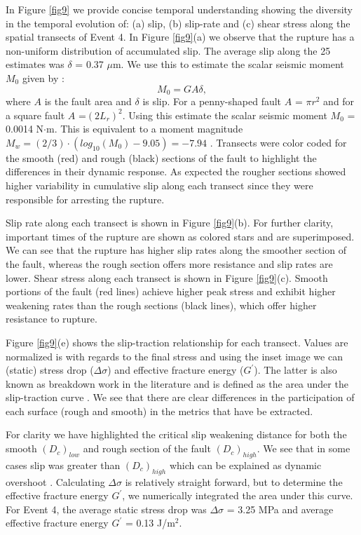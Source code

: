 \documentclass[preprint,1p, 10pt,authoryear]{elsarticle}
\begin{document}
In Figure \ref{fig9} we provide concise temporal understanding showing the diversity in the temporal evolution of: (a) slip, (b) slip-rate and (c) shear stress along the spatial transects of Event 4. In Figure \ref{fig9}(a) we observe that the rupture has a non-uniform distribution of accumulated slip. The average slip along the 25 estimates was $\delta$ = 0.37 $\mu$m.  We use this to estimate the scalar seismic moment $M_{0}$ given by \citet{Aki1966}: 
\begin{equation}
M_{0} = G A \delta, 
\label{eq9}
\end{equation}
\noindent where $A$ is the fault area and $\delta$ is slip. For a penny-shaped fault $A$ = $\pi r^{2}$ and for a square fault $A$ =$(2L_{r})^{2}$. Using this estimate the scalar seismic moment $M_{0}$ = 0.0014 N$\cdot$m. This is equivalent to a moment magnitude $M_{w} = (2/3)\cdot(log_{10}(M_{0})-9.05) = -7.94$ \citep{Kanamori1975}.  Transects were color coded for the smooth (red) and rough (black) sections of the fault to highlight the differences in their dynamic response. As expected the rougher sections showed higher variability in cumulative slip along each transect since they were responsible for arresting the rupture.    

Slip rate along each transect is shown in Figure \ref{fig9}(b). For further clarity, important times of the rupture are shown as colored stars and are superimposed. We can see that the rupture has higher slip rates along the smoother section of the fault, whereas the rough section offers more resistance and slip rates are lower. Shear stress along each transect is shown in Figure \ref{fig9}(c). Smooth portions of the fault (red lines) achieve higher peak stress and exhibit higher weakening rates than the rough sections (black lines), which offer higher resistance to rupture.

Figure \ref{fig9}(e) shows the slip-traction relationship for each transect. Values are normalized is with regards to the final stress and using the inset image we can (static) stress drop ($\Delta\sigma$) and effective fracture energy ($G^{'}$).  The latter is also known as breakdown work in the literature \citep[e.g.,][]{Tinti2005, Cocco2016} and is defined as the area under the slip-traction curve . We see that there are clear differences in the participation of each surface (rough and smooth) in the metrics that have be extracted. 

For clarity we have highlighted the critical slip weakening distance for both the smooth $(D_{c})_{low}$ and rough section of the fault $(D_{c})_{high}$. We see that in some cases slip was greater than $(D_{c})_{high}$ which can be explained as dynamic overshoot \citep{Madariaga1976}. Calculating $\Delta \sigma$ is relatively straight forward, but to determine the effective fracture energy $G^{'}$, we numerically integrated the area under this curve. For Event 4, the average static stress drop was $\Delta\sigma$ = 3.25 MPa and average effective fracture energy $G^{'}$ = 0.13 J/m$^{2}$.  
\end{document}
